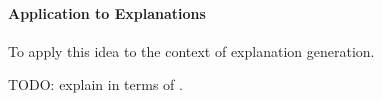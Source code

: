 \paragraph{Application to Explanations}
To apply this idea to the context of explanation generation. 

TODO: explain \fall in terms of \formulag.
% 
% 
% 
% 

% 
%  
% 
% 
%  
% 
% 
% 
%  
% 
% 
%  
% 
%  
% 
%  
% 
% 
% 
%  
% 
% 
